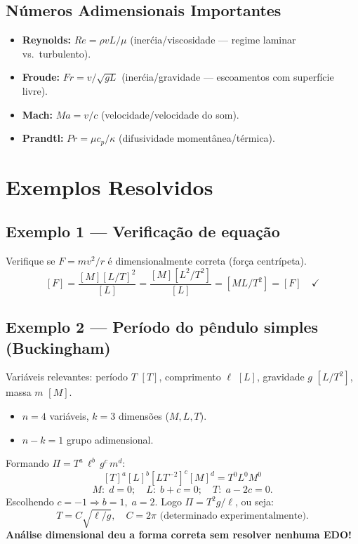 \documentclass[12pt,a4paper]{article}
\begin{document}
\subsection*{N\'umeros Adimensionais Importantes}
\begin{itemize}
  \item \textbf{Reynolds:} $Re = \rho v L / \mu$ \quad (iner\'cia/viscosidade --- regime laminar vs.\ turbulento).
  \item \textbf{Froude:} $Fr = v/\sqrt{gL}$ \quad (iner\'cia/gravidade --- escoamentos com superf\'icie livre).
  \item \textbf{Mach:} $Ma = v/c$ \quad (velocidade/velocidade do som).
  \item \textbf{Prandtl:} $Pr = \mu c_p / \kappa$ \quad (difusividade moment\^anea/t\'ermica).
\end{itemize}

\section*{Exemplos Resolvidos}

\subsection*{Exemplo 1 --- Verifica\c{c}\~ao de equa\c{c}\~ao}
Verifique se $F = mv^2/r$ \'e dimensionalmente correta (for\c{c}a centr\'ipeta).
\[
[F] = \frac{[M][L/T]^2}{[L]} = \frac{[M][L^2/T^2]}{[L]} = [ML/T^2] = [F]\quad\checkmark
\]

\subsection*{Exemplo 2 --- Per\'iodo do p\^endulo simples (Buckingham)}
Vari\'aveis relevantes: per\'iodo $T$ $[T]$, comprimento $\ell$ $[L]$, gravidade $g$ $[L/T^2]$, massa $m$ $[M]$.
\begin{itemize}
  \item $n=4$ vari\'aveis, $k=3$ dimens\~oes ($M, L, T$).
  \item $n-k = 1$ grupo adimensional.
\end{itemize}
Formando $\Pi = T^a\,\ell^b\,g^c\,m^d$:
\[
[T]^a[L]^b[LT^{-2}]^c[M]^d = T^0L^0M^0
\]
\[
M:\; d=0;\quad L:\; b+c=0;\quad T:\; a-2c=0.
\]
Escolhendo $c=-1 \Rightarrow b=1,\; a=2$. Logo $\Pi = T^2 g / \ell$, ou seja:
\[
T = C\sqrt{\ell/g}, \quad C = 2\pi \text{ (determinado experimentalmente)}.
\]
\textbf{An\'alise dimensional deu a forma correta sem resolver nenhuma EDO!}
\end{document}
